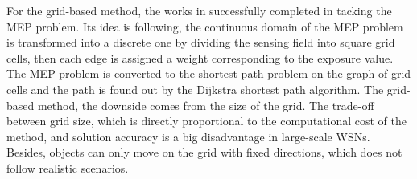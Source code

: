 \documentclass[final]{elsarticle}
\begin{document}
For the grid-based method, the works in \cite{meguerdichian2001exposure, veltri2003minimal,megerian2002exposure, b9, b10} successfully completed in tacking the MEP problem. Its idea is following, the continuous domain of the MEP problem is transformed into a discrete one by dividing the sensing field into square grid cells, then each edge is assigned a weight corresponding to the exposure value. The MEP problem is converted to the shortest path problem on the graph of grid cells and the path is found out by the Dijkstra shortest path algorithm. The grid-based method, the downside comes from the size of the grid. The trade-off between grid size, which is directly proportional to the computational cost of the method, and solution accuracy is a big disadvantage in large-scale WSNs. Besides, objects can only move on the grid with fixed directions, which does not follow realistic scenarios.
\end{document}
